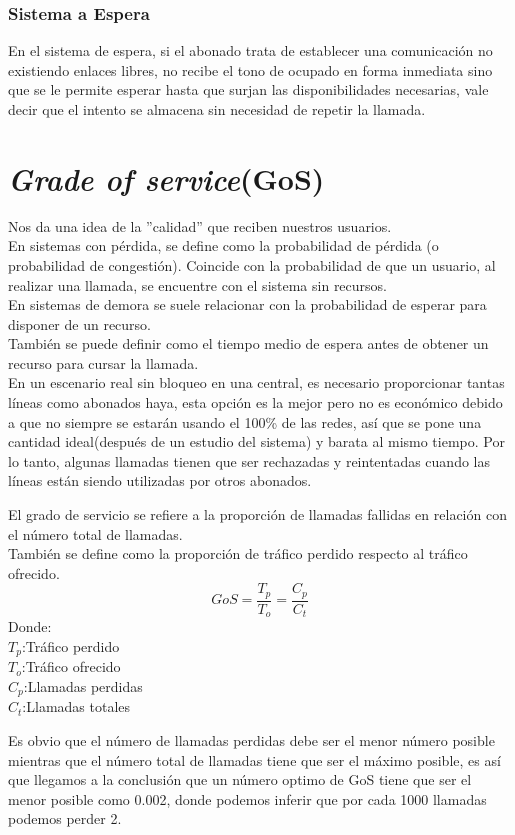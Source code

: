 \documentclass[11pt,fleqn]{book} %
\begin{document}
\subsubsection{Sistema a Espera}
En el sistema de espera, si el abonado trata de establecer una comunicación no existiendo enlaces libres, no recibe el tono de ocupado en forma inmediata sino que se le permite esperar hasta que surjan las disponibilidades necesarias, vale decir que el intento se almacena sin necesidad de repetir la llamada.
\section{\textit{Grade of service}(GoS)}
Nos da una idea de la ''calidad'' que reciben nuestros usuarios.\\
En sistemas con pérdida, se define como la probabilidad de pérdida (o probabilidad de congestión). Coincide con la probabilidad de que un usuario, al realizar una llamada, se encuentre con el sistema sin recursos.\\
En sistemas de demora se suele relacionar con la probabilidad de esperar para disponer de un recurso.\\
También se puede definir como el tiempo medio de espera antes de obtener un recurso para cursar la llamada.\\
En un escenario real sin bloqueo en una central, es necesario proporcionar tantas líneas como abonados haya, esta opción es la mejor pero no es económico debido a que no siempre se estarán usando el 100\% de las redes, así que se pone una cantidad ideal(después de un estudio del sistema) y barata al mismo tiempo. Por lo tanto, algunas llamadas tienen que ser rechazadas y reintentadas cuando las líneas están siendo utilizadas por otros abonados.
\begin{definition}
El grado de servicio se refiere a la proporción de llamadas fallidas en relación con el número total de llamadas.\\
También se define como la proporción de tráfico perdido respecto al tráfico ofrecido.
\begin{equation}
GoS=\frac{T_p}{T_o}=\frac{C_p}{C_t}
\end{equation}
Donde:\\$T_p$:Tráfico perdido\\$T_o$:Tráfico ofrecido\\$C_p$:Llamadas perdidas\\$C_t$:Llamadas totales
\end{definition}
\begin{remark}
Es obvio que el número de llamadas perdidas debe ser el menor número posible mientras que el número total de llamadas tiene que ser el máximo posible, es así que llegamos a la conclusión que un número optimo de GoS tiene que ser el menor posible como 0.002, donde podemos inferir que por cada 1000 llamadas podemos perder 2.
\end{remark}
\end{document}
